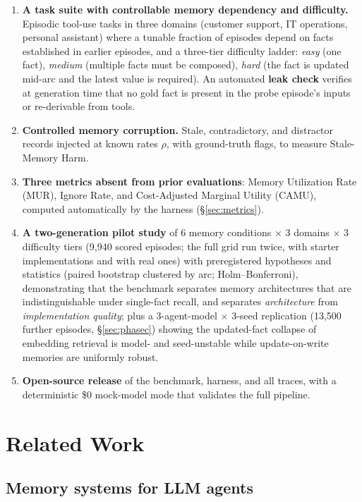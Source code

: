 \documentclass[11pt]{article}
\begin{document}
\begin{enumerate}
\item \textbf{A task suite with controllable memory dependency and
difficulty.} Episodic tool-use tasks in three domains (customer support, IT
operations, personal assistant) where a tunable fraction of episodes depend
on facts established in earlier episodes, and a three-tier difficulty ladder:
\emph{easy} (one fact), \emph{medium} (multiple facts must be composed),
\emph{hard} (the fact is updated mid-arc and the latest value is required).
An automated \textbf{leak check} verifies at generation time that no gold
fact is present in the probe episode's inputs or re-derivable from tools.
\item \textbf{Controlled memory corruption.} Stale, contradictory, and
distractor records injected at known rates $\rho$, with ground-truth flags,
to measure Stale-Memory Harm.
\item \textbf{Three metrics absent from prior evaluations}: Memory
Utilization Rate (MUR), Ignore Rate, and Cost-Adjusted Marginal Utility
(CAMU), computed automatically by the harness (\S\ref{sec:metrics}).
\item \textbf{A two-generation pilot study} of 6 memory conditions $\times$
3 domains $\times$ 3 difficulty tiers (9{,}940 scored episodes; the full
grid run twice, with starter implementations and with real ones) with
preregistered hypotheses and statistics (paired bootstrap clustered by arc;
Holm--Bonferroni), demonstrating that the benchmark separates memory
architectures that are indistinguishable under single-fact recall, and
separates \emph{architecture} from \emph{implementation quality}; plus
a 3-agent-model $\times$ 3-seed replication (13{,}500 further episodes,
\S\ref{sec:phasec}) showing the updated-fact collapse of embedding
retrieval is model- and seed-unstable while update-on-write memories are
uniformly robust.
\item \textbf{Open-source release} of the benchmark, harness, and all
traces, with a deterministic \$0 mock-model mode that validates the full
pipeline.
\end{enumerate}

\section{Related Work}

\subsection{Memory systems for LLM agents}
\end{document}
